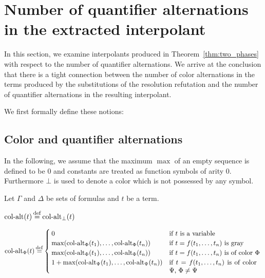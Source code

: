 
\section{Number of quantifier alternations in the extracted interpolant}

In this section, we examine interpolants produced in Theorem~\ref{thm:two_phases} with respect to the number of quantifier alternations.
We arrive at the conclusion that there is a tight connection between the number of color alternations in the terms produced by the substitutions of the resolution refutation and the number of quantifier alternations in the resulting interpolant.  

We first formally define these notions:

\subsection{Color and quantifier alternations}

In the following, we assume that the maximum $\max$ of an empty sequence is defined to be $0$ and constants are treated as function symbols of arity $0$.
Furthermore $\bot$ is used to denote a color which is not possessed by any symbol.
\begin{defi}
	Let $\Gamma$ and $\Delta$ be sets of formulas and $t$ be a term.

	\medskip

	\noindent
	$\ca(t) \defeq \ca_\bot(t)$
	\medskip

	\begin{adjustwidth}{-1.7em}{}
	\noindent
	$
	\ca_\Phi(t) \defeq 
	\begin{cases}
		0 & \text{if $t$ is a variable} \\
		\max(\ca_\Phi(t_1), \dots, \ca_\Phi(t_n)) & \text{if $t = f(t_1, \dots, t_n)$ is gray} \\
		\max(\ca_\Phi(t_1), \dots, \ca_\Phi(t_n)) & \parbox[t]{0.4\textwidth}{if $t = f(t_1, \dots, t_n)$ is of color $\Phi$} \\
		1 + \max(\ca_\Psi(t_1), \dots, \ca_\Psi(t_n)) & \parbox[t]{0.38\textwidth}{if $t = f(t_1, \dots, t_n)$ is of color $\Psi$, $\Phi \neq \Psi$} \\
	\end{cases}
	$
\end{adjustwidth}
\end{defi}



